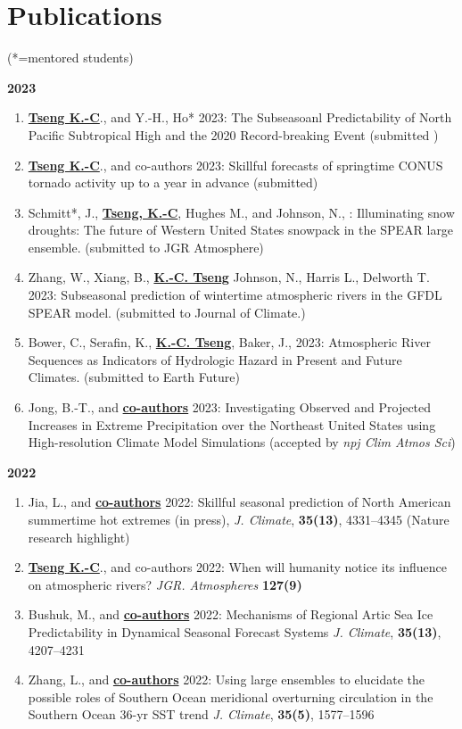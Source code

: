 \documentclass{article}
\begin{document}
\section{\color{airforceblue}Publications} (*=mentored students)\par
\normalsize{\bf{2023}} 
\begin{enumerate} 
	\item \normalsize{\bf{\underline{Tseng K.-C}}}., and Y.-H., Ho* 2023: The Subseasoanl Predictability of North Pacific Subtropical High and the 2020 Record-breaking Event (submitted )
	\item \normalsize{\bf{\underline{Tseng K.-C}}}., and co-authors 2023: Skillful forecasts of springtime CONUS tornado activity up to a year in advance (submitted) 
	\item Schmitt*, J., \normalsize{\bf{\underline{Tseng, K.-C}}}, Hughes M., and Johnson, N., : Illuminating snow droughts: The future of Western United States snowpack in the SPEAR large ensemble. (submitted to JGR Atmosphere)
	\item Zhang, W., Xiang, B., \normalsize{\bf{\underline{K.-C. Tseng}}} Johnson, N., Harris L., Delworth T. 2023: Subseasonal prediction of wintertime atmospheric rivers in the GFDL SPEAR model. (submitted to Journal of Climate.)
	\item Bower, C., Serafin, K., \normalsize{\bf{\underline{K.-C. Tseng}}}, Baker, J., 2023: Atmospheric River Sequences as Indicators of Hydrologic Hazard in Present and Future Climates. (submitted to Earth Future) \par
	\item Jong, B.-T., and \normalsize{\bf{\underline{co-authors}}} 2023: Investigating Observed and Projected Increases in Extreme Precipitation over the Northeast United States using High-resolution Climate Model Simulations  (accepted by \textit{npj Clim Atmos Sci}) \par

\end{enumerate}	
\normalsize{\bf{2022}} 
\begin{enumerate}[resume]     
	\item Jia, L., and \normalsize{\bf{\underline{co-authors}}} 2022: Skillful seasonal prediction of North American summertime hot extremes (in press), \textit{J. Climate}, \normalsize{\bf{35(13)}}, 4331--4345 (Nature research highlight)
	\item \normalsize{\bf{\underline{Tseng K.-C}}}., and co-authors 2022: When will humanity notice its influence on atmospheric rivers? \textit{JGR. Atmospheres} \normalsize{\bf{127(9)}} 
	\item Bushuk, M., and \normalsize{\bf{\underline{co-authors}}} 2022: Mechanisms of Regional Artic Sea Ice Predictability in Dynamical Seasonal Forecast Systems \textit{J. Climate}, \normalsize{\bf{35(13)}}, 4207--4231
	\item Zhang, L., and \normalsize{\bf{\underline{co-authors}}} 2022: Using large ensembles to elucidate the possible roles of Southern Ocean meridional overturning circulation in the Southern Ocean 36-yr SST trend \textit{J. Climate}, \normalsize{\bf{35(5)}}, 1577--1596
\end{enumerate}
\end{document}

